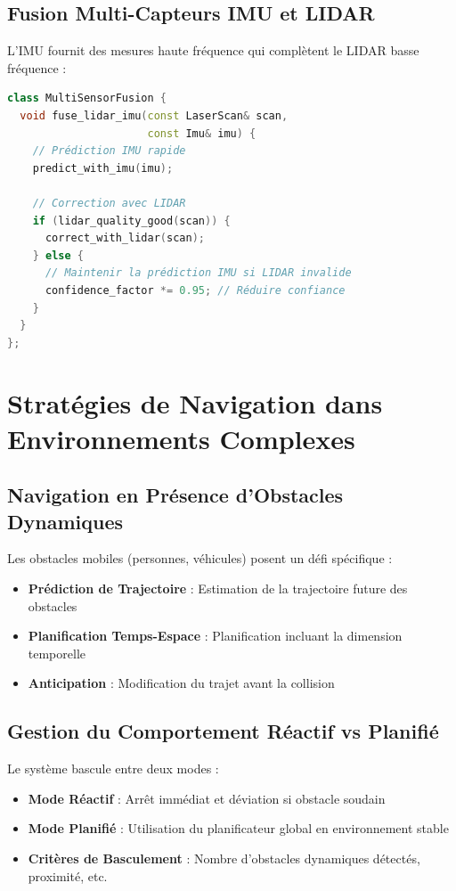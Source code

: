 \documentclass[12pt,a4paper,oneside]{report}
\begin{document}
\subsection{Fusion Multi-Capteurs IMU et LIDAR}

L'IMU fournit des mesures haute fréquence qui complètent le LIDAR basse fréquence :

\begin{lstlisting}[language=C++]
class MultiSensorFusion {
  void fuse_lidar_imu(const LaserScan& scan, 
                      const Imu& imu) {
    // Prédiction IMU rapide
    predict_with_imu(imu);
    
    // Correction avec LIDAR
    if (lidar_quality_good(scan)) {
      correct_with_lidar(scan);
    } else {
      // Maintenir la prédiction IMU si LIDAR invalide
      confidence_factor *= 0.95; // Réduire confiance
    }
  }
};
\end{lstlisting}

\section{Stratégies de Navigation dans Environnements Complexes}

\subsection{Navigation en Présence d'Obstacles Dynamiques}

Les obstacles mobiles (personnes, véhicules) posent un défi spécifique :

\begin{itemize}
  \item \textbf{Prédiction de Trajectoire} : Estimation de la trajectoire future des obstacles
  \item \textbf{Planification Temps-Espace} : Planification incluant la dimension temporelle
  \item \textbf{Anticipation} : Modification du trajet avant la collision
\end{itemize}

\subsection{Gestion du Comportement Réactif vs Planifié}

Le système bascule entre deux modes :

\begin{itemize}
  \item \textbf{Mode Réactif} : Arrêt immédiat et déviation si obstacle soudain
  \item \textbf{Mode Planifié} : Utilisation du planificateur global en environnement stable
  \item \textbf{Critères de Basculement} : Nombre d'obstacles dynamiques détectés, proximité, etc.
\end{itemize}
\end{document}
